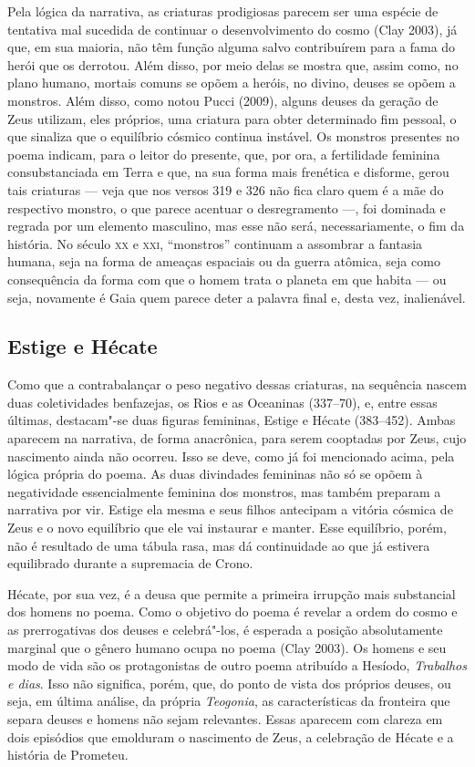 Pela lógica da narrativa, as criaturas prodigiosas parecem ser uma
espécie de tentativa mal sucedida de continuar o desenvolvimento do
cosmo (Clay 2003), já que, em sua maioria, não têm função alguma salvo
contribuírem para a fama do herói que os derrotou. Além disso, por meio
delas se mostra que, assim como, no plano humano, mortais comuns se
opõem a heróis, no divino, deuses se opõem a monstros. Além disso, como
notou Pucci (2009), alguns deuses da geração de Zeus utilizam, eles
próprios, uma criatura para obter determinado fim pessoal, o que
sinaliza que o equilíbrio cósmico continua instável. Os monstros
presentes no poema indicam, para o leitor do presente, que, por ora, a
fertilidade feminina consubstanciada em Terra e que, na sua forma mais
frenética e disforme, gerou tais criaturas --- veja que nos versos 319 e
326 não fica claro quem é a mãe do respectivo monstro, o que parece
acentuar o desregramento ---, foi dominada e regrada por um elemento
masculino, mas esse não será, necessariamente, o fim da história. No
século \textsc{xx} e \textsc{xxi}, ``monstros'' continuam a assombrar a fantasia humana,
seja na forma de ameaças espaciais ou da guerra atômica, seja como
consequência da forma com que o homem trata o planeta em que habita ---
ou seja, novamente é Gaia quem parece deter a palavra final e, desta
vez, inalienável.

\subsection{Estige e Hécate}

Como que a contrabalançar o peso negativo dessas criaturas, na sequência
nascem duas coletividades benfazejas, os Rios e as Oceaninas (337--70),
e, entre essas últimas, destacam"-se duas figuras femininas, Estige e
Hécate (383--452). Ambas aparecem na narrativa, de forma anacrônica, para
serem cooptadas por Zeus, cujo nascimento ainda não ocorreu. Isso se
deve, como já foi mencionado acima, pela lógica própria do poema. As
duas divindades femininas não só se opõem à negatividade essencialmente
feminina dos monstros, mas também preparam a narrativa por vir. Estige
ela mesma e seus filhos antecipam a vitória cósmica de Zeus e o novo
equilíbrio que ele vai instaurar e manter. Esse equilíbrio, porém, não é
resultado de uma tábula rasa, mas dá continuidade ao que já estivera
equilibrado durante a supremacia de Crono.

Hécate, por sua vez, é a deusa que permite a primeira irrupção mais
substancial dos homens no poema. Como o objetivo do poema é revelar a
ordem do cosmo e as prerrogativas dos deuses e celebrá"-los, é esperada a
posição absolutamente marginal que o gênero humano ocupa no poema (Clay
2003). Os homens e seu modo de vida são os protagonistas de outro poema
atribuído a Hesíodo, \emph{Trabalhos e dias}. Isso não significa, porém,
que, do ponto de vista dos próprios deuses, ou seja, em última análise,
da própria \emph{Teogonia}, as características da fronteira que separa
deuses e homens não sejam relevantes. Essas aparecem com clareza em dois
episódios que emolduram o nascimento de Zeus, a celebração de Hécate e a
história de Prometeu.

